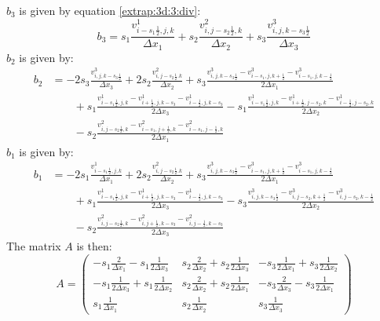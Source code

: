 $b_3$ is given by equation \ref{extrap:3d:3:div}:
\begin{equation}
 b_3=s_1\frac{v^{1}_{i-s_1\frac{1}{2},j,k}}{\Delta x_1}+s_2\frac{v^{2}_{i,j-s_2\frac{1}{2},k}}{\Delta x_2}+s_3\frac{v^{3}_{i,j,k-s_3\frac{1}{2}}}{\Delta x_3}
\end{equation}
$b_2$ is given by:
\begin{equation}
\begin{split}
	b_2&=-2s_3\frac{v^{3}_{i,j,k-s_3\frac{1}{2}}}{\Delta x_3}+2s_2\frac{v^{2}_{i,j-s_2\frac{1}{2}.k}}{\Delta x_2}+s_3\frac{v^{3}_{i,j,k-s_3\frac{1}{2}}-v^{3}_{i-s_1,j,k+\frac{1}{2}}-v^{3}_{i-s_1,j,k-\frac{1}{2}}}{2\Delta x_1}\\
	&\qquad +s_1\frac{v^{1}_{i-s_1\frac{1}{2},j,k}-v^{1}_{i+\frac{1}{2},j,k-s_3}-v^{1}_{i-\frac{1}{2},j,k-s_3}}{2\Delta x_3}-s_1\frac{v^{1}_{i-s_1\frac{1}{2},j,k}-v^{1}_{i+\frac{1}{2},j-s_2,k}-v^{1}_{i-\frac{1}{2},j-s_2,k}}{2\Delta x_2}\\
	&\qquad -s_2\frac{v^{2}_{i,j-s_2\frac{1}{2},k}-v^{2}_{i-s_1,j+\frac{1}{2},k}-v^{2}_{i-s_1,j-\frac{1}{2},k}}{2\Delta x_1}
\end{split}
	\end{equation}
$b_1$ is given by:
\begin{equation}
\begin{split}
	b_1&=-2s_1\frac{v^{1}_{i-s_1\frac{1}{2},j,k}}{\Delta x_1}+2s_2\frac{v^{2}_{i,j-s_2\frac{1}{2}.k}}{\Delta x_2}
	+s_3\frac{v^{3}_{i,j,k-s_3\frac{1}{2}}-v^{3}_{i-s_1,j,k+\frac{1}{2}}-v^{3}_{i-s_1,j,k-\frac{1}{2}}}{2\Delta x_1}\\
	&\qquad +s_1\frac{v^{1}_{i-s_1\frac{1}{2},j,k}-v^{1}_{i+\frac{1}{2},j,k-s_3}-v^{1}_{i-\frac{1}{2},j,k-s_3}}{2\Delta x_3}
	-s_3\frac{v^{3}_{i,j,k-s_3\frac{1}{2}}-v^{3}_{i,j-s_2,k+\frac{1}{2}}-v^{3}_{i,j-s_2,k-\frac{1}{2}}}{2\Delta x_2}\\
	&\qquad -s_2\frac{v^{2}_{i,j-s_2\frac{1}{2},k}-v^{2}_{i,j+\frac{1}{2},k-s_3}-v^{2}_{i,j-\frac{1}{2},k-s_3}}{2\Delta x_3}
	\end{split}
\end{equation}
The matrix $A$ is then:
\begin{equation}
 A=\begin{pmatrix}
    -s_1\frac{2}{\Delta x_1}-s_1\frac{1}{2\Delta x_3}&s_2\frac{2}{\Delta x_2}+s_2\frac{1}{2\Delta x_3}&-s_3\frac{1}{2\Delta x_1}+s_3\frac{1}{2\Delta x_2}\\
    -s_1\frac{1}{2\Delta x_3}+s_1\frac{1}{2\Delta x_2}&s_2\frac{2}{\Delta x_2}+s_2\frac{1}{2\Delta x_1}&-s_3\frac{2}{\Delta x_3}-s_3\frac{1}{2\Delta x_1}\\
    s_1\frac{1}{\Delta x_1}&s_2\frac{1}{\Delta x_2}&s_3\frac{1}{\Delta x_3}
   \end{pmatrix}
\end{equation}


